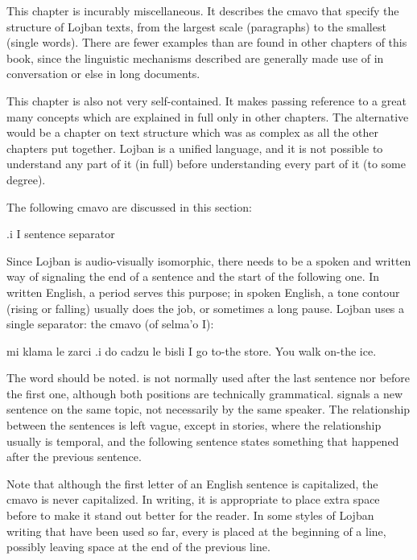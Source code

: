 This chapter is incurably miscellaneous. It describes the
    cmavo that specify the structure of Lojban texts, from the
    largest scale (paragraphs) to the smallest (single words).
    There are fewer examples than are found in other chapters of
    this book, since the linguistic mechanisms described are
    generally made use of in conversation or else in long
    documents.

This chapter is also not very self-contained. It makes
    passing reference to a great many concepts which are explained
    in full only in other chapters. The alternative would be a
    chapter on text structure which was as complex as all the other
    chapters put together. Lojban is a unified language, and it is
    not possible to understand any part of it (in full) before
    understanding every part of it (to some degree).



The following cmavo are discussed in this section:

   .i  I   sentence separator

Since Lojban is audio-visually isomorphic, there needs to be a
    spoken and written way of signaling the end of a sentence and
    the start of the following one. In written English, a period
    serves this purpose; in spoken English, a tone contour (rising
    or falling) usually does the job, or sometimes a long pause.
    Lojban uses a single separator: the cmavo  (of selma'o
    I):
\begin{example}
mi klama le zarci .i do cadzu le bisli\n
I go to-the store.  You walk on-the ice.
\end{example}

The word  should be noted.  is not normally
    used after the last sentence nor before the first one, although
    both positions are technically grammatical.  signals a
    new sentence on the same topic, not necessarily by the same
    speaker. The relationship between the sentences is left vague,
    except in stories, where the relationship usually is temporal,
    and the following sentence states something that happened after
    the previous sentence. 

Note that although the first letter of an English sentence
    is capitalized, the cmavo  is never capitalized. In
    writing, it is appropriate to place extra space before 
    to make it stand out better for the reader. In some styles of
    Lojban writing that have been used so far, every  is
    placed at the beginning of a line, possibly leaving space at
    the end of the previous line.

